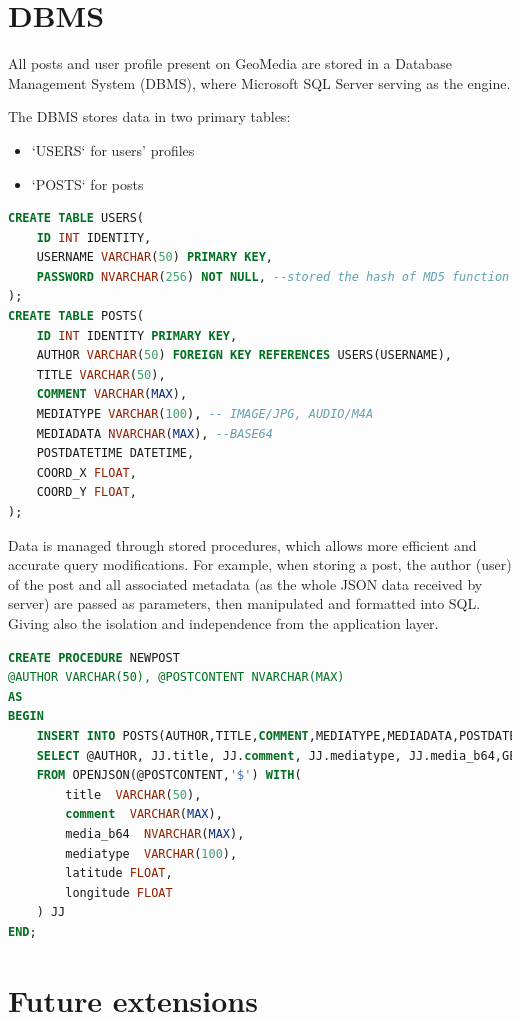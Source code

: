 \documentclass[conference]{IEEEtran}
\begin{document}
\section{DBMS}

All posts and user profile present on GeoMedia are stored in a Database Management System (DBMS), where Microsoft SQL Server\cite{b7} serving as the engine.

The DBMS stores data in two primary tables:

\begin{itemize}
    \item `USERS` for users' profiles
    \item `POSTS` for posts 
\end{itemize}

\begin{lstlisting}[language=SQL, caption=Tables creation]
CREATE TABLE USERS(
    ID INT IDENTITY,
    USERNAME VARCHAR(50) PRIMARY KEY,
    PASSWORD NVARCHAR(256) NOT NULL, --stored the hash of MD5 function
);
CREATE TABLE POSTS(
	ID INT IDENTITY PRIMARY KEY,
	AUTHOR VARCHAR(50) FOREIGN KEY REFERENCES USERS(USERNAME),
	TITLE VARCHAR(50),
	COMMENT VARCHAR(MAX),
	MEDIATYPE VARCHAR(100), -- IMAGE/JPG, AUDIO/M4A
	MEDIADATA NVARCHAR(MAX), --BASE64
	POSTDATETIME DATETIME,
	COORD_X FLOAT,
	COORD_Y FLOAT,
);
\end{lstlisting}

Data is managed through stored procedures, which allows more efficient and accurate query modifications. For example, when storing a post,
the author (user) of the post and all associated metadata (as the whole JSON data received by server) are passed as parameters, then manipulated and formatted into SQL. Giving also the isolation and independence from the application layer.

\begin{lstlisting}[language=SQL, caption=Stored Procedure of post creation]
CREATE PROCEDURE NEWPOST
@AUTHOR VARCHAR(50), @POSTCONTENT NVARCHAR(MAX)
AS
BEGIN
	INSERT INTO POSTS(AUTHOR,TITLE,COMMENT,MEDIATYPE,MEDIADATA,POSTDATETIME, LATITUDE, LONGITUDE)
	SELECT @AUTHOR, JJ.title, JJ.comment, JJ.mediatype, JJ.media_b64,GETDATE(), JJ.latitude ,JJ.longitude 
	FROM OPENJSON(@POSTCONTENT,'$') WITH(
		title  VARCHAR(50),
		comment  VARCHAR(MAX),
		media_b64  NVARCHAR(MAX),
		mediatype  VARCHAR(100),
		latitude FLOAT,
		longitude FLOAT
	) JJ
END;

\end{lstlisting}


\section{Future extensions}
\end{document}
